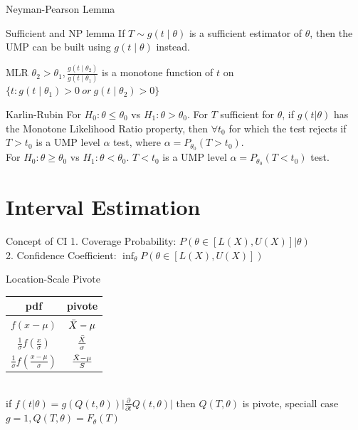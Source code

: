 \documentclass{article}
\begin{document}
\begin{multicols*}{3}
\begin{thmbox}{Neyman-Pearson Lemma}
\end{thmbox}

\begin{thmbox}{Sufficient and NP lemma}
If $T\sim g(t \mid \theta)$ is a sufficient estimator of $\theta$, then the UMP can be built using  $g(t \mid \theta)$ instead.
\end{thmbox}

\begin{thmbox}{MLR}
$\theta_2 > \theta_1, \frac{g(t \mid \theta_2)}{ g(t \mid \theta_1)}$ is a monotone function of $t$ on $\{t:g(t\mid \theta_1) > 0 \  or \ g(t\mid \theta_2) > 0\}$
\end{thmbox}
\begin{thmbox}{Karlin-Rubin}
For $H_0: \theta\leq\theta_0$ vs $H_1: \theta>\theta_0$. For $T$ sufficient for $\theta$, if $g(t|\theta)$ has the Monotone Likelihood Ratio property, then $\forall t_0$ for which the test rejects if $T>t_0$ is a UMP  level $\alpha$ test, where $\alpha = P_{\theta_0}(T > t_0)$. \\
For $H_0: \theta\geq\theta_0$ vs $H_1:\theta<\theta_0$. $T < t_0$ is a UMP level $\alpha = P_{\theta_0}(T<t_0)$ test.
\end{thmbox}

\section{Interval Estimation}

\begin{thmbox}{Concept of CI}
   1. Coverage Probability: $P(\theta \in [L(X), U(X)]\lvert \theta)$ \\ 
   2. Confidence Coefficient: $\inf_{\theta}P(\theta \in [L(X), U(X)])$
\end{thmbox}

\begin{thmbox}{Location-Scale Pivote}
    \begin{tabular}{cc}
        \toprule  
        pdf & pivote \\
        \midrule  
        $f(x-\mu)$ & $\Bar{X} - \mu$  \\
        \midrule
        $\frac{1}{\sigma}f(\frac{x}{\sigma})$ & $\frac{\Bar{X}}{\sigma}$ \\
        \midrule
        $\frac{1}{\sigma}f(\frac{x - \mu}{\sigma})$ & $\frac{\Bar{X}-\mu}{S}$ \\
        \bottomrule
    \end{tabular} \\
    if $f(t \lvert \theta) = g(Q(t,\theta))\lvert \frac{\partial}{\partial t} Q(t,\theta)\rvert$ then $Q(T,\theta)$ is pivote, speciall case $g = 1, Q(T,\theta) = F_{\theta}(T)$ 


\end{thmbox}
\end{multicols*}
\end{document}

